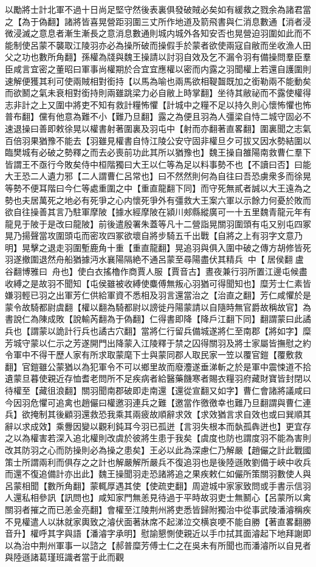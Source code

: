 以勵將士計北軍不過十日尚足堅守然後表裏俱發破賊必矣如有緩救之戮余為諸君當之【為于偽翻】諸將皆喜晃營距羽圍三丈所作地道及箭飛書與仁消息數通【消者浸微浸滅之意息者漸生漸長之意消息數通則城内城外各知安否也晃營迫羽圍如此而不能制使呂蒙不襲取江陵羽亦必為操所破而操假手於蒙者欲使兩寇自敝而坐收漁人田父之功也數所角翻】孫權為牋與魏王操請以討羽自效及乞不漏令羽有備操問羣臣羣臣咸言宜密之董昭曰軍事尚權期於合宜宜應權以密而内露之羽聞權上若還自護圍則速解便獲其利可使兩賊相對銜持【以馬為喻也兩馬欲相鞮齧既加之銜勒兩不能動矣而欲鬭之氣未衰相對銜持則兩雖跳梁力必自敝上時掌翻】坐待其敝祕而不露使權得志非計之上又圍中將吏不知有救計糧怖懼【計城中之糧不足以持久則心懷怖懼也怖普布翻】儻有他意為難不小【難乃旦翻】露之為便且羽為人彊梁自恃二城守固必不速退操曰善即敕徐晃以權書射著圍裏及羽屯中【射而亦翻著直畧翻】圍裏聞之志氣百倍羽果猶豫不能去【羽雖見權書自恃江陵公安守固非權旦夕可拔又因水勢結圍以臨樊城有必破之勢釋之而去必喪前功此其所以猶豫也】魏王操自雒陽南救曹仁羣下皆謂王不亟行今敗矣侍中桓階獨曰大王以仁等為足以料事勢不也【不讀曰否】曰能大王恐二人遺力邪【二人謂曹仁呂常也】曰不然然則何為自往曰吾恐虜衆多而徐晃等勢不便耳階曰今仁等處重圍之中【重直龍翻下同】而守死無貳者誠以大王遠為之勢也夫居萬死之地必有死爭之心内懷死爭外有彊救大王案六軍以示餘力何憂於敗而欲自往操善其言乃駐軍摩陂【據水經摩陂在潁川郟縣縱廣可一十五里魏青龍元年有龍見于陂于是改曰龍陂】前後遣殷署朱蓋等凡十二營詣晃關羽圍頭有屯又别屯四冢晃乃揚聲當攻圍頭屯而密攻四冢欲壞自將步騎五千出戰【自將之上有羽字文意乃明】晃擊之退走羽圍塹鹿角十重【重直龍翻】晃追羽與俱入圍中破之傳方胡修皆死羽遂撤圍退然舟船猶據沔水襄陽隔絶不通呂蒙至尋陽盡伏其精兵中【居侯翻盧谷翻博雅曰舟也】使白衣搖櫓作商賈人服【賈音古】晝夜兼行羽所置江邊屯候盡收縛之是故羽不聞知【屯侯雖被收縛使麋傅無叛心羽猶可得聞知也】糜芳士仁素皆嫌羽輕已羽之出軍芳仁供給軍資不悉相及羽言還當治之【治直之翻】芳仁咸懼於是蒙令故騎都尉虞翻【權以翻為騎都尉以謗徙丹陽蒙請以自隨時無官爵故稱故官】為書說仁為陳成敗【說輸芮翻為于偽翻】仁得書即降【降戶江翻下同】翻謂蒙曰此譎兵也【謂蒙以詭計行兵也譎古穴翻】當將仁行留兵備城遂將仁至南郡【將如字】糜芳城守蒙以仁示之芳遂開門出降蒙入江陵釋于禁之囚得關羽及將士家屬皆撫慰之約令軍中不得干歷人家有所求取蒙麾下士與蒙同郡人取民家一笠以覆官鎧【覆敷救翻】官鎧雖公蒙猶以為犯軍令不可以鄉里故而廢灋遂垂涕斬之於是軍中震悚道不拾遺蒙旦暮使親近存恤耆老問所不足疾病者給醫藥饑寒者賜衣糧羽府藏財寶皆封閉以待權至【藏徂浪翻】關羽聞南郡破即走南還【還從宣翻又如字】曹仁會諸將議咸曰今因羽危懼可追禽也趙儼曰權邀羽連兵之難【邀當作徼徼幸也難乃旦翻謂與曹仁連兵】欲掩制其後顧羽還救恐我乘其兩疲故順辭求效【求效猶言求自效也或曰巽順其辭以求成效】乘釁因變以觀利鈍耳今羽已孤迸【言羽失根本而埶孤犇迸也】更宜存之以為權害若深入追北權則改虞於彼將生患于我矣【虞度也防也謂度羽不能為害則改其防羽之心而防操則必為操之患矣】王必以此為深慮仁乃解嚴【趙儼之計此戰國策士所謂兩利而俱存之之計也解嚴解所嚴兵不復追羽也是後陸遜敗劉備于峽中收兵而還不復追備計亦出此】魏王操聞羽走恐諸將追之果疾敕仁如儼所策關羽數使人與呂蒙相聞【數所角翻】蒙輒厚遇其使【使疏吏翻】周遊城中家家致問或手書示信羽人還私相參訊【訊問也】咸知家門無恙見待過于平時故羽吏士無鬭心【呂蒙所以禽關羽者摧之而已恙金亮翻】會權至江陵荆州將吏悉皆歸附獨治中從事武陵潘濬稱疾不見權遣人以牀就家輿致之濬伏面著牀席不起涕泣交横哀哽不能自勝【著直畧翻勝音升】權呼其字與語【潘濬字承明】慰諭懇惻使親近以手巾拭其面濬起下地拜謝即以為治中荆州軍事一以諮之【郝普糜芳傅士仁之在吳未有所聞也而潘濬所以自見者與陸遜諸葛瑾班識者當于此而觀